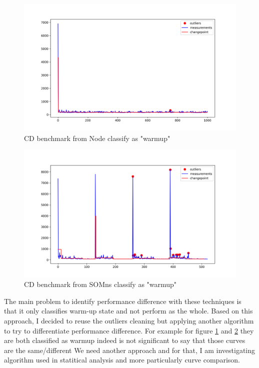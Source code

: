 \documentclass{article}
\begin{document}
\begin{figure}[h!]
    \centering
    \includegraphics[width=1\textwidth]{images/plot_6_flat.png}
    \caption{CD benchmark from Node classify as "warmup" }
    \label{fig:bench_node_flat}
\end{figure}



\begin{figure}[h!]
    \centering
    \includegraphics[width=1\textwidth]{images/plot_10_flat.png}
    \caption{CD benchmark from SOMns classify as "warmup"}
    \label{fig:bench_somns_flat}
\end{figure}


The main problem to identify performance difference with these techniques is that it only classifies warm-up state and not perform as the whole. Based on this approach, I decided to reuse the outliers cleaning but applying another algorithm to try to differentiate performance difference. For example for figure \ref{fig:bench_node_flat} and \ref{fig:bench_somns_flat} they are both classified as warmup indeed is not significant to say that those curves are the same/different We need another approach and for that, I am investigating algorithm used in statitical analysis and more particularly curve comparison.
\end{document}
